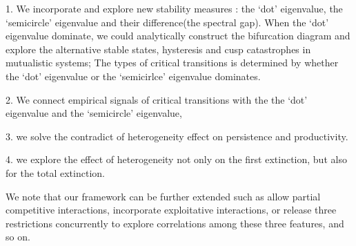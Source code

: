 \documentclass[a4paper,fleqn,12pt]{article}
\begin{document}
\clearpage

1. We incorporate and explore new stability measures : the `dot' eigenvalue, the `semicircle' eigenvalue and their difference(the spectral gap).
When the `dot' eigenvalue dominate, we could analytically construct the bifurcation diagram and explore the alternative stable states, hysteresis and cusp catastrophes in mutualistic systems;
The types of critical transitions is determined by whether the `dot' eigenvalue or the `semicirlce' eigenvalue dominates.

2. We connect empirical signals of critical transitions with the the `dot' eigenvalue and the `semicircle' eigenvalue,

3. we solve the contradict of heterogeneity effect on persistence and productivity.

4. we explore the effect of heterogeneity not only on the first extinction, but also for the total extinction.

We note that our framework can be further extended such as allow partial competitive interactions, incorporate exploitative interactions, or release three restrictions concurrently to explore correlations among these three features,
and so on.

\end{document}
